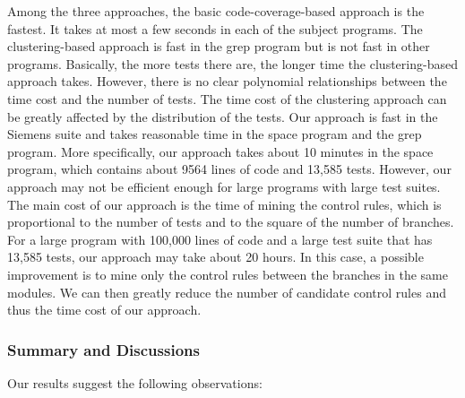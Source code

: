\documentclass{sig-alternate}
\begin{document}
Among the three approaches, the basic code-coverage-based approach
is the fastest. It takes at most a few seconds in each of the
subject programs. The clustering-based approach is fast in the grep
program but is not fast in other programs. Basically, the more tests
there are, the longer time the clustering-based approach takes.
However, there is no clear polynomial relationships between the time
cost and the number of tests. The time cost of the clustering
approach can be greatly affected by the distribution of the tests.
Our approach is fast in the Siemens suite and takes reasonable time
in the space program and the grep program. More specifically, our
approach takes about 10 minutes in the space program, which contains
about 9564 lines of code and 13,585 tests. However, our approach may
not be efficient enough for large programs with large test suites.
The main cost of our approach is the time of mining the control
rules, which is proportional to the number of tests and to the
square of the number of branches. For a large program with 100,000
lines of code and a large test suite that has 13,585 tests, our
approach may take about 20 hours. In this case, a possible
improvement is to mine only the control rules between the branches
in the same modules. We can then greatly reduce the number of
candidate control rules and thus the time cost of our approach.


\subsubsection{Summary and Discussions}

Our results suggest the following observations:
\end{document}
